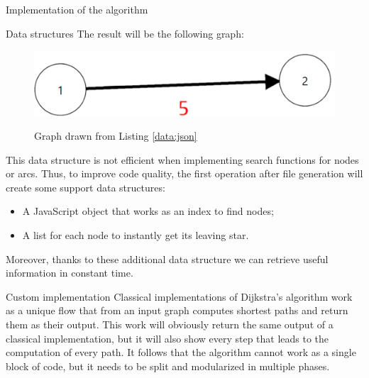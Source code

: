 \documentclass[9pt]{extarticle}
\begin{document}
\begin{section}{Implementation of the algorithm}
\begin{subsection}{Data structures}
            The result will be the following graph:
            \vspace{10px}
            \begin{figure}[h]
                \includegraphics[scale=0.2]{graph1.png}
                \centering
                \vspace{20px}
                \begin{description}
                    \centering
                    \item[Figure 1] Graph drawn from Listing \ref{data:json}
                \end{description}
            \end{figure}
            \vspace{10px}
            
            This data structure is not efficient when implementing search functions for nodes or arcs. Thus, to improve code quality, the first
            operation after file generation will create some support data structures:
            \begin{itemize}
                \item A JavaScript object that works as an index to find nodes;
                \item A list for each node to instantly get its leaving star.
            \end{itemize}
            Moreover, thanks to these additional data structure we can retrieve useful information in constant time.
        \end{subsection}
        
        \begin{subsection}{Custom implementation}
            Classical implementations of Dijkstra's algorithm work as a unique flow that from an input graph computes shortest paths and return
            them as their output.
            This work will obviously return the same output of a classical implementation, but it will also show every step that
            leads to the computation of every path.
            It follows that the algorithm cannot work as a single block of code, but it needs to be split and modularized in 
            multiple phases.


\end{subsection}
\end{section}
\end{document}
